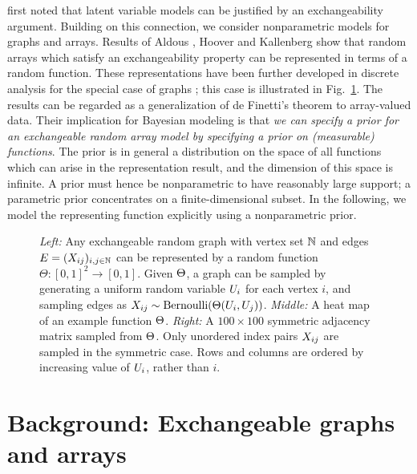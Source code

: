 \citet{Hoff2007a} first noted that latent variable models can be justified by an exchangeability argument.
Building on this connection, we consider nonparametric models for graphs and arrays.
Results of
Aldous \cite{Aldous:1981}, Hoover \cite{Hoover:1979} and Kallenberg \cite{Kallenberg:1992} show
that random arrays which satisfy an exchangeability property can be represented in terms of a random
function. These representations have been further developed in discrete analysis for the
special case of graphs \citep{Lovasz:Szegedy:2006}; this case is illustrated in Fig.~\ref{fig:W:graph}.
The results can be regarded as a generalization of de Finetti's theorem to array-valued data.
Their implication for Bayesian modeling is that
\emph{we can specify a prior for an exchangeable random array model by specifying a prior on (measurable) functions}.
The prior is in general a distribution on the space of all functions which can arise in the representation
result, and the dimension of this space is infinite. A prior must hence be nonparametric to have reasonably large support;
a parametric prior concentrates on a finite-dimensional subset.
In the following, we model the representing function explicitly using a nonparametric prior.

\begin{figure}
 \begin{center}
    
  \end{center}
 \caption{\emph{Left:} Any exchangeable random graph with vertex set $\mathbb{N}$ and edges ${E=(X_{ij})_{i,j\in\mathbb{N}}}$ can be represented
   by a random function ${\Theta:[0,1]^2\rightarrow[0,1]}$. Given $\Theta$, a graph can be sampled by generating a uniform random 
   variable $U_i$ for each vertex $i$, and sampling edges as ${X_{ij}\sim\mbox{\rm Bernoulli}(\Theta(U_i,U_j))}$.
   \emph{Middle:} A heat map of an example function $\Theta$.
   \emph{Right:} A ${100\times 100}$ symmetric adjacency matrix sampled from $\Theta$.
   Only unordered index pairs $X_{ij}$ are sampled in the symmetric case. Rows and columns are ordered
   by increasing value of $U_i$, rather than $i$.}
 \label{fig:W:graph}
\end{figure}


\section{Background: Exchangeable graphs and arrays}
\label{sec:background}

